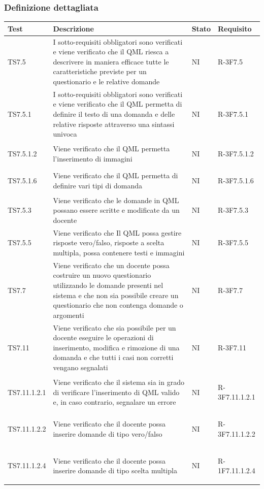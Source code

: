 \documentclass[12pt,a4paper]{article}
\begin{document}
	\subsubsection{Definizione dettagliata}
	\begin{longtable}{l p{6cm} l l}
		\midrule
		\textbf{Test} & \textbf{Descrizione} & \textbf{Stato} & \textbf{Requisito} \tabularnewline
		\midrule
		\midrule
		TS7.5 & I sotto-requisiti obbligatori sono verificati e viene verificato che il QML riesca a descrivere in maniera efficace tutte le caratteristiche previste per un questionario e le relative domande & NI& \hypertarget{R-3F7.5}{R-3F7.5}\tabularnewline
		\midrule
		TS7.5.1 & I sotto-requisiti obbligatori sono verificati e viene verificato che il QML permetta di definire il testo di una domanda e delle relative risposte attraverso una sintassi univoca & NI& \hypertarget{R-3F7.5.1}{R-3F7.5.1}\tabularnewline
		\midrule
		TS7.5.1.2 & Viene verificato che il QML permetta l'inserimento di immagini & NI& \hypertarget{R-3F7.5.1.2}{R-3F7.5.1.2}\tabularnewline
		\midrule
		TS7.5.1.6 & Viene verificato che il QML permetta di definire vari tipi di domanda & NI& \hypertarget{R-3F7.5.1.6}{R-3F7.5.1.6}\tabularnewline
		\midrule
		TS7.5.3 & Viene verificato che le domande in QML possano essere scritte e modificate da un docente & NI& \hypertarget{R-3F7.5.3}{R-3F7.5.3}\tabularnewline
		\midrule
		TS7.5.5 & Viene verificato che Il QML possa gestire risposte vero/falso, risposte a scelta multipla, possa contenere testi e immagini	 & NI& \hypertarget{R-3F7.5.5}{R-3F7.5.5}\tabularnewline
		\midrule
		TS7.7 & Viene verificato che un docente possa costruire un nuovo questionario utilizzando le domande presenti nel sistema e che non sia possibile creare un questionario che non contenga domande o argomenti
		& NI& \hypertarget{R-3F7.7}{R-3F7.7}\tabularnewline
		\midrule
		TS7.11 & Viene verificato che sia possibile per un docente eseguire le operazioni di inserimento, modifica e rimozione di una domanda e che tutti i casi non corretti vengano segnalati & NI& \hypertarget{R-3F7.11}{R-3F7.11}\tabularnewline
		\midrule
		TS7.11.1.2.1 & Viene verificato che il sistema sia in grado di verificare l'inserimento di QML valido e, in caso contrario, segnalare un errore & NI& \hypertarget{R-3F7.11.1.2.1}{R-3F7.11.1.2.1}\tabularnewline
		\midrule
		TS7.11.1.2.2 & Viene verificato che il docente possa inserire domande di tipo vero/falso	 & NI& \hypertarget{R-3F7.11.1.2.2}{R-3F7.11.1.2.2}\tabularnewline
		\midrule
		TS7.11.1.2.4 & Viene verificato che il docente possa inserire domande di tipo scelta multipla & NI& \hypertarget{R-1F7.11.1.2.4}{R-1F7.11.1.2.4}\tabularnewline

\end{longtable}
\end{document}

